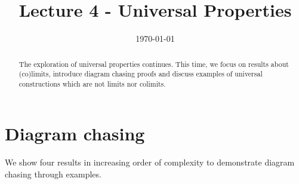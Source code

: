 \documentclass{article}
\title{Lecture 4 - Universal Properties\vspace{-10pt}}
\date{\vspace{-30pt}\today\vspace{-15pt}}  %
\theoremstyle{definition}
\theoremstyle{remark}
\begin{document}
\maketitle
\begin{abstract} The exploration of universal properties continues. This time, we focus on results about (co)limits, introduce diagram chasing proofs and discuss examples of universal constructions which are not limits nor colimits.
\end{abstract}
\section{Diagram chasing}
We show four results in increasing order of complexity to demonstrate diagram chasing through examples.
\end{document}
